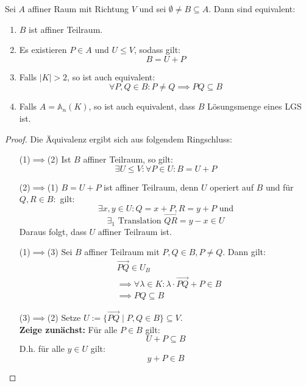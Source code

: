 \documentclass[parskip,a4paper,twoside,DIV15,BCOR12mm]{scrbook}
\begin{document}
\begin{theo}[Teilraumkriterium]
\label{Satz 20.1}
Sei $A$ affiner Raum mit Richtung $V$ und sei $\emptyset \ne B\subseteq A$. Dann 
sind equivalent:
\begin{enumerate}
\item $B$ ist affiner Teilraum.
\item Es existieren $P\in A$ und $U\le V$, sodass gilt:
\[B=U+P\]
\item Falls $|K| >2$, so ist auch equivalent:
\[\forall P,Q\in B: P\ne Q \implies PQ \subseteq B\]
\item Falls $A=\mathbb{A}_n(K)$, so ist auch equivalent, dass $B$ Lösungsmenge eines LGS ist.
\end{enumerate}
\end{theo}

\begin{proof}
Die Äquivalenz ergibt sich aus folgendem Ringschluss:
\begin{itemize}
\item[(1)$\implies$(2)] Ist $B$ affiner Teilraum, so gilt:
\[\exists U\le V:\forall P\in U:B=U+P\]
\item[(2)$\implies$(1)] $B=U+P$ ist affiner Teilraum, denn $U$ operiert auf $B$
und für $Q,R\in B:$ gilt:
\[\exists x,y\in U: Q=x+P,R=y+P \text{ und}\] 
\[\exists_1 \text{ Translation } \overrightarrow{QR}=y-x\in U\]
Daraus folgt, dass $U$ affiner Teilraum ist.
\item[(1)$\implies$(3)] Sei $B$ affiner Teilraum mit $P,Q\in B, P\ne Q$. Dann gilt:
\begin{align*}
&\overrightarrow{PQ}\in U_B\\
&\implies\forall \lambda\in K:\lambda\cdot\overrightarrow{PQ}+P\in B\\
&\implies PQ\subseteq B
\end{align*}
\item[(3)$\implies$(2)] Setze $U:=\{\overrightarrow{PQ}\mid P,Q\in B\}\subseteq V$.\\
\textbf{Zeige zunächst:} Für alle $P\in B$ gilt:
\[U+P\subseteq B\] 
D.h. für alle $y\in U$ gilt:
\[y+P\in B\]
\end{itemize}
\end{proof}
\end{document}
